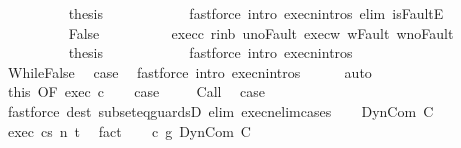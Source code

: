 \begin{isabellebody}
\ \ \ \ \ \ \ \ \isamarkupfalse%
\ {\isacharquery}thesis\isanewline
\ \ \ \ \ \ \ \ \ \ \isamarkupfalse%
\ {\isacharparenleft}fastforce\ intro{\isacharcolon}\ execn{\isachardot}intros\ elim{\isacharcolon}\ isFaultE{\isacharparenright}\isanewline
\ \ \ \ \ \ \isamarkupfalse%
\isanewline
\ \ \ \ \ \ \ \ \isamarkupfalse%
\ False\isanewline
\ \ \ \ \ \ \ \ \isamarkupfalse%
\ exec{\isacharunderscore}c{\isacharprime}\ r{\isacharunderscore}in{\isacharunderscore}b\ u{\isacharprime}{\isacharunderscore}noFault\ exec{\isacharunderscore}w\ w{\isacharunderscore}Fault\ w{\isacharprime}{\isacharunderscore}noFault\isanewline
\ \ \ \ \ \ \ \ \isamarkupfalse%
\ {\isacharquery}thesis\isanewline
\ \ \ \ \ \ \ \ \ \ \isamarkupfalse%
\ {\isacharparenleft}fastforce\ intro{\isacharcolon}\ execn{\isachardot}intros{\isacharparenright}\isanewline
\ \ \ \ \ \ \isamarkupfalse%
\isanewline
\ \ \ \ \isamarkupfalse%
\isanewline
\ \ \ \ \ \ \isamarkupfalse%
\ WhileFalse\ \isamarkupfalse%
\ {\isacharquery}case\ \isamarkupfalse%
\ {\isacharparenleft}fastforce\ intro{\isacharcolon}\ execn{\isachardot}intros{\isacharparenright}\isanewline
\ \ \ \ \isamarkupfalse%
\ auto\isanewline
\ \ \isacommand{{\isacharbraceright}}\isamarkupfalse%
\isanewline
\ \ \isamarkupfalse%
\ this\ {\isacharbrackleft}OF\ exec\ c{\isacharbrackright}\isanewline
\ \ \isamarkupfalse%
\ {\isacharquery}case\ \isacommand{{\isachardot}}\isamarkupfalse%
\isanewline
{}\isamarkupfalse%
\isanewline
\ \ \isamarkupfalse%
\ Call\ \isamarkupfalse%
\ {\isacharquery}case\ \isanewline
\ \ \ \ \isamarkupfalse%
\ {\isacharparenleft}fastforce\ dest{\isacharcolon}\ subseteq{\isacharunderscore}guardsD\ elim{\isacharcolon}\ execn{\isacharunderscore}elim{\isacharunderscore}cases{\isacharparenright}\isanewline
{}\isamarkupfalse%
\isanewline
\ \ \isamarkupfalse%
\ {\isacharparenleft}DynCom\ C{\isacharprime}{\isacharparenright}\ \isanewline
\ \ \isamarkupfalse%
\ exec{\isacharcolon}\ {\isachardoublequoteopen}{\isasymGamma}{\isasymturnstile}{\isasymlangle}c{\isacharcomma}s{\isasymrangle}\ {\isacharequal}n{\isasymRightarrow}\ t{\isachardoublequoteclose}\ \isamarkupfalse%
\ fact\isanewline
\ \ \isamarkupfalse%
\ {\isachardoublequoteopen}c\ {\isasymsubseteq}\isactrlsub g\ DynCom\ C{\isacharprime}{\isachardoublequoteclose}\ \isamarkupfalse%

\end{isabellebody}
